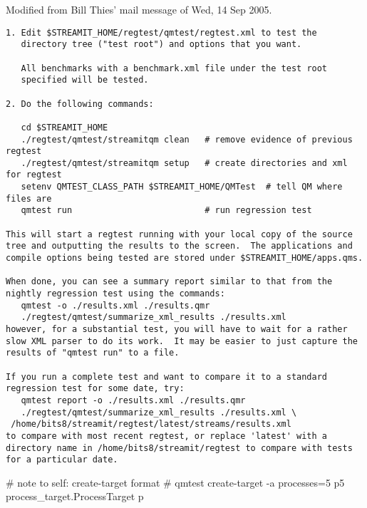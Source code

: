 \documentclass[11pt]{article}
\begin{document}
Modified from Bill Thies' mail message of  Wed, 14 Sep 2005.
\begin{verbatim}
1. Edit $STREAMIT_HOME/regtest/qmtest/regtest.xml to test the
   directory tree ("test root") and options that you want.

   All benchmarks with a benchmark.xml file under the test root
   specified will be tested.

2. Do the following commands:

   cd $STREAMIT_HOME
   ./regtest/qmtest/streamitqm clean   # remove evidence of previous regtest
   ./regtest/qmtest/streamitqm setup   # create directories and xml for regtest
   setenv QMTEST_CLASS_PATH $STREAMIT_HOME/QMTest  # tell QM where files are
   qmtest run                          # run regression test

This will start a regtest running with your local copy of the source
tree and outputting the results to the screen.  The applications and
compile options being tested are stored under $STREAMIT_HOME/apps.qms.

When done, you can see a summary report similar to that from the
nightly regression test using the commands:
   qmtest -o ./results.xml ./results.qmr 
   ./regtest/qmtest/summarize_xml_results ./results.xml
however, for a substantial test, you will have to wait for a rather
slow XML parser to do its work.  It may be easier to just capture the
results of "qmtest run" to a file.

If you run a complete test and want to compare it to a standard
regression test for some date, try:
   qmtest report -o ./results.xml ./results.qmr 
   ./regtest/qmtest/summarize_xml_results ./results.xml \
 /home/bits8/streamit/regtest/latest/streams/results.xml
to compare with most recent regtest, or replace 'latest' with a
directory name in /home/bits8/streamit/regtest to compare with tests
for a particular date.
\end{verbatim}
# note to self: create-target format
# qmtest create-target -a processes=5 p5 process_target.ProcessTarget p
\end{document}
